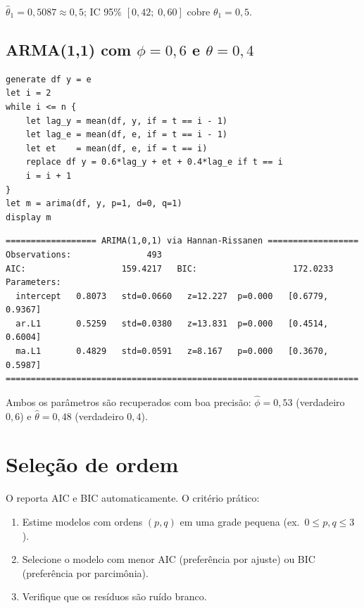 $\hat\theta_1 = 0{,}5087 \approx 0{,}5$; IC 95\% $[0{,}42;\; 0{,}60]$
cobre $\theta_1 = 0{,}5$.

\subsection*{ARMA(1,1) com $\phi=0{,}6$ e $\theta=0{,}4$}

\begin{lstlisting}[caption={DGP ARMA(1{,}1) e estimação}]
generate df y = e
let i = 2
while i <= n {
    let lag_y = mean(df, y, if = t == i - 1)
    let lag_e = mean(df, e, if = t == i - 1)
    let et    = mean(df, e, if = t == i)
    replace df y = 0.6*lag_y + et + 0.4*lag_e if t == i
    i = i + 1
}
let m = arima(df, y, p=1, d=0, q=1)
display m
\end{lstlisting}

\begin{lstlisting}[language={}, basicstyle=\ttfamily\small,
  frame=none, numbers=none, backgroundcolor=\color{codbg},
  xleftmargin=0pt, xrightmargin=0pt, breaklines=false]
================== ARIMA(1,0,1) via Hannan-Rissanen ==================
Observations:               493
AIC:                   159.4217   BIC:                   172.0233
Parameters:
  intercept   0.8073   std=0.0660   z=12.227  p=0.000   [0.6779, 0.9367]
  ar.L1       0.5259   std=0.0380   z=13.831  p=0.000   [0.4514, 0.6004]
  ma.L1       0.4829   std=0.0591   z=8.167   p=0.000   [0.3670, 0.5987]
======================================================================
\end{lstlisting}

Ambos os parâmetros são recuperados com boa precisão: $\hat\phi = 0{,}53$
(verdadeiro $0{,}6$) e $\hat\theta = 0{,}48$ (verdadeiro $0{,}4$).

\section{Seleção de ordem}

O \hayashi{} reporta AIC e BIC automaticamente. O critério prático:

\begin{enumerate}
  \item Estime modelos com ordens $(p,q)$ em uma grade pequena (ex.\ $0
        \leq p,q \leq 3$).
  \item Selecione o modelo com menor AIC (preferência por ajuste) ou BIC
        (preferência por parcimônia).
  \item Verifique que os resíduos são ruído branco.
\end{enumerate}

